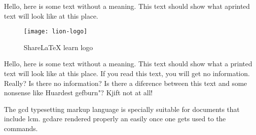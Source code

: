 \documentclass[../main.tex]{subfiles}
\begin{document}
 

Hello, here is some text without a meaning. This text should show what aprinted text will look like at this place.

\begin{figure}[bh]
\centering
\texttt{[image: lion-logo]}
\label{fig:img1}
\caption{ShareLaTeX learn logo}
\end{figure}

Hello, here is some text without a meaning.  This text should show what a printed text will look like at this place.  If you read this text, you will get no information.  Really?  Is there no information?  Is there a diference between this text and some nonsense like Huardest gefburn"?  Kjift  not at all!

The \acrlong{gcd} typesetting markup language is specially suitable for documents that include \acrshort{lcm}. \acrfull{gcd}are rendered properly an easily once one gets used to the commands.
\end{document}

